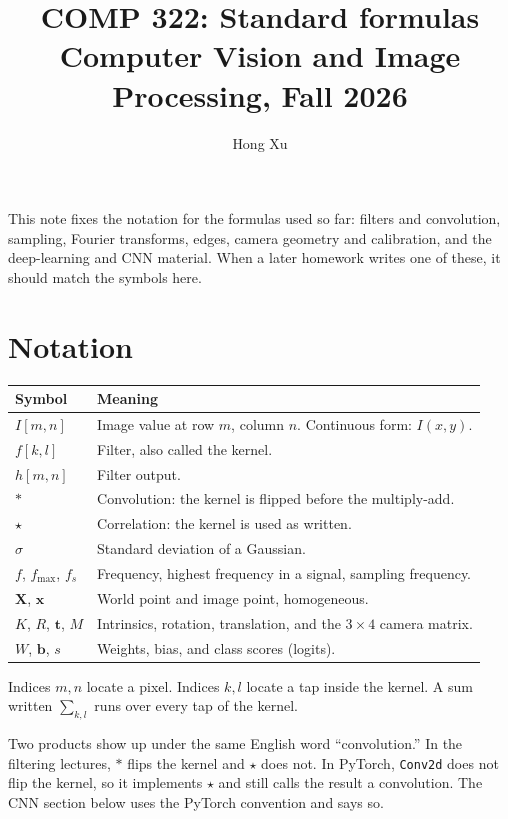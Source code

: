 \documentclass[11pt]{article}
\title{COMP 322: Standard formulas\\
\large Computer Vision and Image Processing, Fall 2026}
\author{Hong Xu}
\date{}
\newcommand{\img}{I}
\newcommand{\filt}{f}
\newcommand{\outp}{h}
\newcommand{\conv}{\ast}
\newcommand{\corr}{\star}
\begin{document}
\maketitle

\noindent
This note fixes the notation for the formulas used so far: filters and convolution, sampling, Fourier transforms, edges, camera geometry and calibration, and the deep-learning and CNN material. When a later homework writes one of these, it should match the symbols here.

\section{Notation}

\begin{center}
\begin{tabular}{@{}ll@{}}
\toprule
Symbol & Meaning \\
\midrule
$\img[m,n]$ & Image value at row $m$, column $n$. Continuous form: $\img(x,y)$. \\
$\filt[k,l]$ & Filter, also called the kernel. \\
$\outp[m,n]$ & Filter output. \\
$\conv$ & Convolution: the kernel is flipped before the multiply-add. \\
$\corr$ & Correlation: the kernel is used as written. \\
$\sigma$ & Standard deviation of a Gaussian. \\
$f$, $f_{\max}$, $f_s$ & Frequency, highest frequency in a signal, sampling frequency. \\
$\mathbf{X}$, $\mathbf{x}$ & World point and image point, homogeneous. \\
$K$, $R$, $\mathbf{t}$, $M$ & Intrinsics, rotation, translation, and the $3\times 4$ camera matrix. \\
$W$, $\mathbf{b}$, $s$ & Weights, bias, and class scores (logits). \\
\bottomrule
\end{tabular}
\end{center}

Indices $m,n$ locate a pixel. Indices $k,l$ locate a tap inside the kernel. A sum written $\sum_{k,l}$ runs over every tap of the kernel.

Two products show up under the same English word ``convolution.'' In the filtering lectures, $\conv$ flips the kernel and $\corr$ does not. In PyTorch, \texttt{Conv2d} does not flip the kernel, so it implements $\corr$ and still calls the result a convolution. The CNN section below uses the PyTorch convention and says so.
\end{document}
